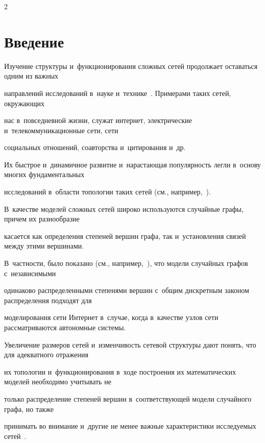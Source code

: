 \begin{multicols}{2}



\label{st\stat}



\section{Введение}



\vspace*{-1pt}



Изучение структуры и~функционирования сложных сетей продолжает оставаться одним из важных

направлений исследований в~науке и~технике~\cite{Dur,Hof1}. Примерами таких сетей, окружающих

нас в~повседневной жизни, служат интернет, электрические и~телекоммуникационные сети, сети

социальных отношений, соавторства и~цитирования и~др.

Их быст\-рое и~динамичное развитие и~нарастающая популярность легли в~основу многих фундаментальных

исследований в~об\-ласти топологии таких сетей (см., например,~\cite{Dur,Hof1,Hof2,New1,New2}).

В~качестве моделей слож\-ных сетей широко используются случайные графы, причем их разнообразие

касается как определения степеней вершин графа, так и~уста\-нов\-ле\-ния связей между этими вершинами.

В~частности, было показано (см., например,~\cite{Fa,RN}), что модели случайных графов с~независимыми

одинаково распределенными степенями вершин с~общим дискретным законом распределения подходят для

моделирования сети Интернет в~случае, когда в~качестве узлов сети рассматриваются автономные системы.



Увеличение размеров сетей и~изменчивость сетевой структуры дают понять, что для адекватного отражения

их топологии и~функционирования в~ходе по\-стро\-ения их математических моделей необходимо учитывать не

только распределение степеней вершин в~со\-от\-вет\-ст\-ву\-ющей модели случайного графа, но также

принимать во внимание и~другие не менее важ\-ные характеристики исследуемых сетей~\cite{Hof1, New1}.


\end{multicols}
